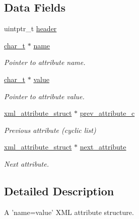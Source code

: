 \subsection*{Data Fields}
\begin{DoxyCompactItemize}
\item 
uintptr\-\_\-t \hyperlink{structpugi_1_1xml__attribute__struct_a0dca6ca6c129bbf87a7ebaf87f3e12de}{header}
\item 
\hyperlink{namespacepugi_aef5a7a62cba0507542220ea15afe39df}{char\-\_\-t} $\ast$ \hyperlink{structpugi_1_1xml__attribute__struct_aa886c4aae23a132e1704717721ee2c19}{name}
\begin{DoxyCompactList}\small\item\em Pointer to attribute name. \end{DoxyCompactList}\item 
\hyperlink{namespacepugi_aef5a7a62cba0507542220ea15afe39df}{char\-\_\-t} $\ast$ \hyperlink{structpugi_1_1xml__attribute__struct_ae652627d56cb9dcc0afdd1fbf6570364}{value}
\begin{DoxyCompactList}\small\item\em Pointer to attribute value. \end{DoxyCompactList}\item 
\hyperlink{structpugi_1_1xml__attribute__struct}{xml\-\_\-attribute\-\_\-struct} $\ast$ \hyperlink{structpugi_1_1xml__attribute__struct_a0e3a022235b316e4cfc1034ceb7d7862}{prev\-\_\-attribute\-\_\-c}
\begin{DoxyCompactList}\small\item\em Previous attribute (cyclic list) \end{DoxyCompactList}\item 
\hyperlink{structpugi_1_1xml__attribute__struct}{xml\-\_\-attribute\-\_\-struct} $\ast$ \hyperlink{structpugi_1_1xml__attribute__struct_a9860c0eb7fa72dc9b69ee9b0575f9efc}{next\-\_\-attribute}
\begin{DoxyCompactList}\small\item\em Next attribute. \end{DoxyCompactList}\end{DoxyCompactItemize}


\subsection{Detailed Description}
A 'name=value' X\-M\-L attribute structure. 

